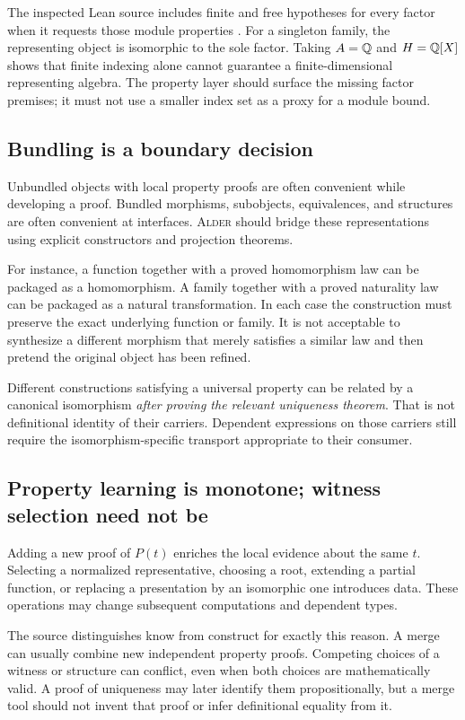 \documentclass[11pt,a4paper]{article}
\newcommand{\Alder}{\textsc{Alder}}
\newcommand{\kw}[1]{\textsf{#1}}
\theoremstyle{plain}
\theoremstyle{definition}
\theoremstyle{remark}
\begin{document}
The inspected Lean source includes finite and free hypotheses for every factor when it requests those module properties \cite{tensor}. For a singleton family, the representing object is isomorphic to the sole factor. Taking $A=\mathbb Q$ and $H=\mathbb Q[X]$ shows that finite indexing alone cannot guarantee a finite-dimensional representing algebra. The property layer should surface the missing factor premises; it must not use a smaller index set as a proxy for a module bound.

\subsection{Bundling is a boundary decision}
Unbundled objects with local property proofs are often convenient while developing a proof. Bundled morphisms, subobjects, equivalences, and structures are often convenient at interfaces. \Alder{} should bridge these representations using explicit constructors and projection theorems.

For instance, a function together with a proved homomorphism law can be packaged as a homomorphism. A family together with a proved naturality law can be packaged as a natural transformation. In each case the construction must preserve the exact underlying function or family. It is not acceptable to synthesize a different morphism that merely satisfies a similar law and then pretend the original object has been refined.

Different constructions satisfying a universal property can be related by a canonical isomorphism \emph{after proving the relevant uniqueness theorem}. That is not definitional identity of their carriers. Dependent expressions on those carriers still require the isomorphism-specific transport appropriate to their consumer.

\subsection{Property learning is monotone; witness selection need not be}
Adding a new proof of $P(t)$ enriches the local evidence about the same $t$. Selecting a normalized representative, choosing a root, extending a partial function, or replacing a presentation by an isomorphic one introduces data. These operations may change subsequent computations and dependent types.

The source distinguishes \kw{know} from \kw{construct} for exactly this reason. A merge can usually combine new independent property proofs. Competing choices of a witness or structure can conflict, even when both choices are mathematically valid. A proof of uniqueness may later identify them propositionally, but a merge tool should not invent that proof or infer definitional equality from it.
\end{document}
